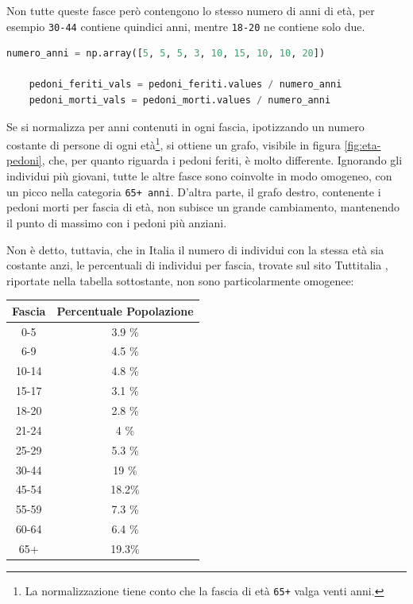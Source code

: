 \documentclass[a4paper]{report}
\newcommand{\columnstyle}[1]{\texttt{#1}}
\begin{document}
Non tutte queste fasce però contengono lo stesso numero di anni di età, 
per esempio \columnstyle{30-44} contiene quindici anni, mentre 
\columnstyle{18-20} ne contiene solo due.

\begin{lstlisting}[language=Python]
    numero_anni = np.array([5, 5, 5, 3, 10, 15, 10, 10, 20])

    pedoni_feriti_vals = pedoni_feriti.values / numero_anni
    pedoni_morti_vals = pedoni_morti.values / numero_anni
\end{lstlisting}

Se si normalizza per anni contenuti in ogni fascia, ipotizzando un numero 
costante di persone di ogni età\footnote{La normalizzazione tiene conto 
che la fascia di età \columnstyle{65+} valga venti anni.}, 
si ottiene un grafo, visibile in figura \ref{fig:eta-pedoni}, che, per 
quanto riguarda i pedoni feriti, è molto differente.
Ignorando gli individui più giovani, tutte le altre fasce sono coinvolte 
in modo omogeneo, con un picco nella categoria \columnstyle{65+ anni}.
D'altra parte, il grafo destro, contenente i pedoni morti per fascia di età, 
non subisce un grande cambiamento, mantenendo il punto di massimo con 
i pedoni più anziani.

Non è detto, tuttavia, che in Italia il numero di individui con 
la stessa età sia costante anzi, le percentuali di individui per fascia, 
trovate sul sito Tuttitalia \cite{TUTTITALIA:1}, riportate nella tabella 
sottostante, non sono particolarmente omogenee: 

\begin{center}
    \def\arraystretch{1.5}%
    \begin{tabular}{ |c|c| } 
    \hline
    Fascia & Percentuale Popolazione \\ 
    \hline
    \rowcolor{TableGray}
    0-5     & 3.9 \% \\ 
    6-9     & 4.5 \% \\
    \rowcolor{TableGray}
    10-14   & 4.8 \% \\
    15-17   & 3.1 \% \\
    \rowcolor{TableGray}
    18-20   & 2.8 \% \\ 
    21-24   & 4   \% \\
    \rowcolor{TableGray}
    25-29   & 5.3 \% \\
    30-44   & 19  \% \\
    \rowcolor{TableGray}
    45-54   & 18.2\% \\ 
    55-59   & 7.3 \% \\
    \rowcolor{TableGray}
    60-64   & 6.4 \% \\
    65$+$   & 19.3\% \\
    \hline
    \end{tabular}
\end{center}
\end{document}

